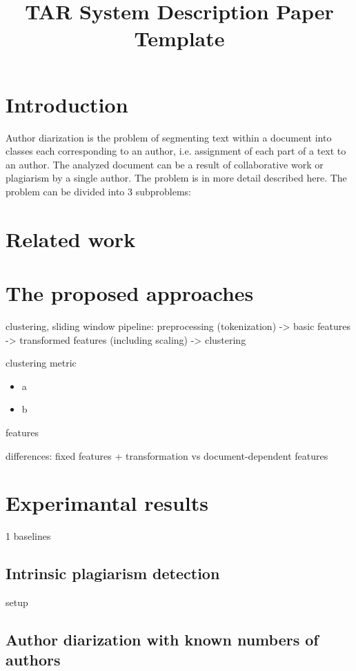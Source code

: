 \documentclass[10pt, a4paper]{article}
\title{TAR System Description Paper Template}
\begin{document}
\maketitleabstract

\section{Introduction}

Author diarization is the problem of segmenting text within a document into classes each corresponding to an author, i.e. assignment of each part of a text to an author. The analyzed document can be a result of collaborative work or plagiarism by a single author. The problem is in more detail described here. The problem can be divided into 3 subproblems:

\section{Related work}


\section{The proposed approaches}
clustering, sliding window
pipeline: preprocessing (tokenization) -> basic features -> transformed features (including scaling) -> clustering

clustering metric

\begin{itemize}
\item a
\item b
\end{itemize}

features

differences: fixed features + transformation vs document-dependent features

\section{Experimantal results}

1
baselines



\subsection{Intrinsic plagiarism detection}

setup

\subsection{Author diarization with known numbers of authors}
\end{document}
